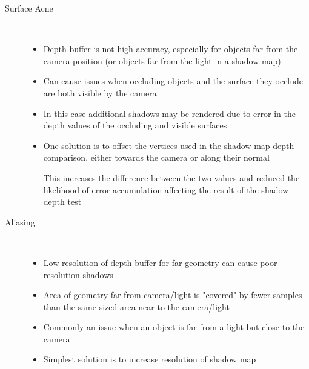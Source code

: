 \documentclass[a4paper]{article}
\begin{document}
\begin{description}
  \item[Surface Acne] \hfill \\

    \begin{itemize}
      \item
        Depth buffer is not high accuracy, especially for objects far from the
        camera position (or objects far from the light in a shadow map)

      \item
        Can cause issues when occluding objects and the surface they occlude are
        both visible by the camera

      \item
        In this case additional shadows may be rendered due to error in the
        depth values of the occluding and visible surfaces

      \item
        One solution is to offset the vertices used in the shadow map depth
        comparison, either towards the camera or along their normal

        This increases the difference between the two values and reduced the
        likelihood of error accumulation affecting the result of the shadow
        depth test

    \end{itemize}

  \item[Aliasing] \hfill \\

    \begin{itemize}
      \item
        Low resolution of depth buffer for far geometry can cause poor
        resolution shadows

      \item
        Area of geometry far from camera/light is "covered" by fewer samples
        than the same sized area near to the camera/light

      \item
        Commonly an issue when an object is far from a light but close to the
        camera

      \item
        Simplest solution is to increase resolution of shadow map

    \end{itemize}

\end{description}
\end{document}
